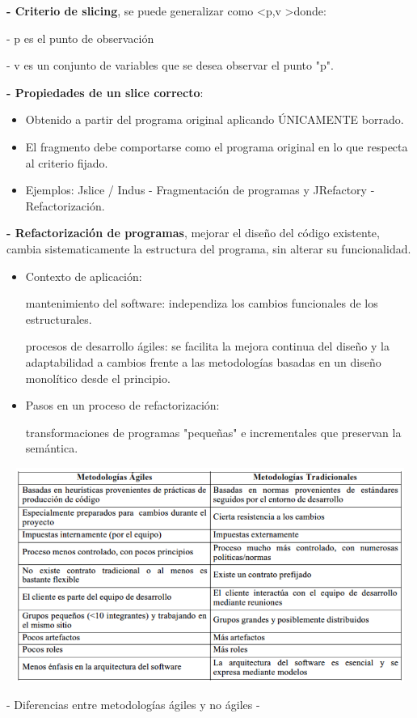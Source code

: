 \documentclass[12pt]{amsart}
\begin{document}
    \textbf{- Criterio de slicing}, se puede generalizar como
        \textless p,v \textgreater donde:
        
        - p es el punto de observación

        - v es un conjunto de variables que se desea observar
        el punto "p".

    \textbf{- Propiedades de un slice correcto}:

    \begin{itemize}
        \item Obtenido a partir del programa original aplicando
        ÚNICAMENTE borrado.
        \item El fragmento debe comportarse como el programa original
        en lo que respecta al criterio fijado.
        \item Ejemplos: Jslice / Indus - Fragmentación de programas y
        JRefactory - Refactorización.
    \end{itemize}

    \textbf{- Refactorización de programas}, mejorar el diseño del código
    existente, cambia sistematicamente la estructura del
    programa, sin alterar su funcionalidad.

    \begin{itemize}
        \item Contexto de aplicación:
        
        \textrightarrow mantenimiento del
        software: independiza los cambios funcionales de los
        estructurales.

        \textrightarrow procesos de desarrollo ágiles: se
        facilita la mejora continua del diseño y la adaptabilidad
        a cambios frente a las metodologías basadas en un
        diseño monolítico desde el principio.

        \item Pasos en un proceso de refactorización:

        \textrightarrow transformaciones de programas "pequeñas"
        e incrementales que preservan la semántica.
        
    \end{itemize}

    \begin{center}
        \includegraphics[width=15cm, height=7cm]{t2agilnoagil.png}
        
        - Diferencias entre metodologías ágiles y no ágiles -
    \end{center}
\end{document}
